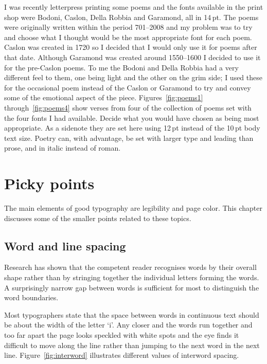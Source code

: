 \documentclass[10pt,a4paper,oneside,extrafontsizes]{memoir}%
\newcommand\U[2]{\textrm{#1}\,\textrm{#2}}
\begin{document}
\begin{paracol}{2}
\switchEng
    I was recently letterpress printing some poems and the fonts  
available in the print shop were Bodoni, 
Caslon, Della Robbia and 
Garamond, 
all in \U{14}{pt}. The poems
were originally written within the period 701--2008 and my problem was to
try and choose what I thought would be the most appropriate font for each
poem. Caslon was created in 1720 so I decided that 
I would only use it for poems after that date. Although 
Garamond was created around 1550--1600 I
decided to use it for the pre-Caslon poems. 
To me the Bodoni and 
Della Robbia  
had a very different feel to them, one being light and the other on the grim
side; I used these for the occasional poem instead of the 
Caslon or Garamond
to try and convey some of the emotional aspect of the piece. 
Figures~\ref{fig:poems1} through~\ref{fig:poems4} show verses from four
of the collection of poems set with the four fonts I had available. 
Decide what you would have chosen as being most appropriate. As a 
sidenote they are set here using \U{12}{pt} instead of the \U{10}{pt} body text size.
Poetry can, with advantage, be set with larger type and 
leading than prose,
and in italic instead of roman.
\end{paracol}



\chapter{Picky points}
\let\footnoterule\oldfootnoterule

\begin{paracol}{2}
\switchEng
    The main elements of good typography are legibility 
and page color.
This chapter discusses some of the smaller points related to 
these topics.
\end{paracol}

\section{Word and line spacing}

\begin{paracol}{2}
\switchEng
    Research has shown that the competent reader recognises words by
their overall shape rather than by stringing together the individual letters
forming the words. A surprisingly narrow gap between words
is sufficient for most to distinguish the word boundaries.

    Most typographers state that the space between 
words
 in continuous
text should be about the width of the letter `i'. Any closer and the
words run together and too far apart the page looks speckled with white
spots and the eye finds it difficult to move along the line rather than
jumping to the next word in the next line. 
    Figure~\ref{fig:interword} illustrates different values of interword
spacing.
\end{paracol}
\end{document}
